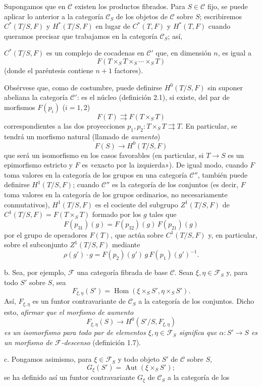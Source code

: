 \documentclass[11pt,twoside,openany]{book}
\numberwithin{equation}{section}
\newcommand{\src}[1]{%
  \phantomsection\hypertarget{src:#1}{}%
  \marginpar{\raggedleft\footnotesize\sffamily #1}%
}
\theoremstyle{plain}
\theoremstyle{definition}
\theoremstyle{remark}
\newcommand{\FgaUnitKey}{frontmatter}
\renewcommand{\src}[1]{%
  \phantomsection\hypertarget{src:\FgaUnitKey:#1}{}%
  \marginpar{\raggedleft\footnotesize\sffamily #1}%
}
\theoremstyle{plain}
\theoremstyle{definition}
\theoremstyle{remark}
\begin{document}
Supongamos que en $\mathcal C$ existen los productos fibrados. Para
$S\in\mathcal C$ fijo, se puede aplicar lo anterior a la categoría
$\mathcal C_S$ de los objetos de $\mathcal C$ sobre $S$; escribiremos
$C^*(T/S,F)$ y $H^*(T/S,F)$ en lugar de $C^*(T,F)$ y $H^*(T,F)$ cuando
queramos precisar que trabajamos en la categoría $\mathcal C_S$; así,

\src{311}
$C^*(T/S,F)$ es un complejo de cocadenas en $\mathcal C'$ que, en dimensión
$n$, es igual a
\[
  F(T\times_ST\times_S\cdots\times_ST)
\]
(donde el paréntesis contiene $n+1$ factores).

Obsérvese que, como de costumbre, puede definirse $H^0(T/S,F)$ sin suponer
abeliana la categoría $\mathcal C'$: es el núcleo (definición 2.1), si existe,
del par de morfismos $F(p_i)$ ($i=1,2$)
\[
  F(T)\rightrightarrows F(T\times_ST)
\]
correspondientes a las dos proyecciones
$p_1,p_2:T\times_ST\rightrightarrows T$. En particular, se tendrá un morfismo
natural (llamado de \emph{aumento})
\[
  F(S)\longrightarrow H^0(T/S,F)
\]
que será un isomorfismo en los casos favorables (en particular, si
$T\longrightarrow S$ es un epimorfismo estricto y $F$ es «exacto por la
izquierda»). De igual modo, cuando $F$ toma valores en la categoría de los
grupos en una categoría $\mathcal C''$, también puede definirse $H^1(T/S,F)$;
cuando $\mathcal C''$ es la categoría de los conjuntos (es decir, $F$ toma
valores en la categoría de los grupos ordinarios, no necesariamente
conmutativos), $H^1(T/S,F)$ es el cociente del subgrupo $Z^1(T/S,F)$ de
$C^1(T/S,F)=F(T\times_ST)$ formado por los $g$ tales que
\[
  F(p_{31})(g)=F(p_{32})(g)\,F(p_{21})(g)
\]
por el grupo de operadores $F(T)$, que actúa sobre $C^1(T/S,F)$ y, en
particular, sobre el subconjunto $Z^1(T/S,F)$ mediante
\[
  \rho(g')\cdot g=F(p_2)(g')\,g\,F(p_1)(g')^{-1}.
\]

\medskip\noindent
b. Sea, por ejemplo, $\mathcal F$ una categoría fibrada de base $\mathcal C$.
Sean $\xi,\eta\in\mathcal F_S$ y, para todo $S'$ sobre $S$, sea
\[
  F_{\xi,\eta}(S')=
  \operatorname{Hom}(\xi\times_SS',\eta\times_SS').
\]
Así, $F_{\xi,\eta}$ es un funtor contravariante de $\mathcal C_S$ a la
categoría de los conjuntos. Dicho esto, \emph{afirmar que el morfismo de
aumento}
\[
  F_{\xi,\eta}(S)\longrightarrow H^0(S'/S,F_{\xi,\eta})
\]
\emph{es un isomorfismo para todo par de elementos
$\xi,\eta\in\mathcal F_S$ significa que
$\alpha:S'\longrightarrow S$ es un morfismo de $\mathcal F$-descenso}
(definición 1.7).

\medskip\noindent
c. Pongamos asimismo, para $\xi\in\mathcal F_S$ y todo objeto $S'$ de
$\mathcal C$ sobre $S$,
\[
  G_\xi(S')=\operatorname{Aut}(\xi\times_SS') ;
\]
se ha definido así un funtor contravariante $G_\xi$ de $\mathcal C_S$ a la
categoría de los
\end{document}
